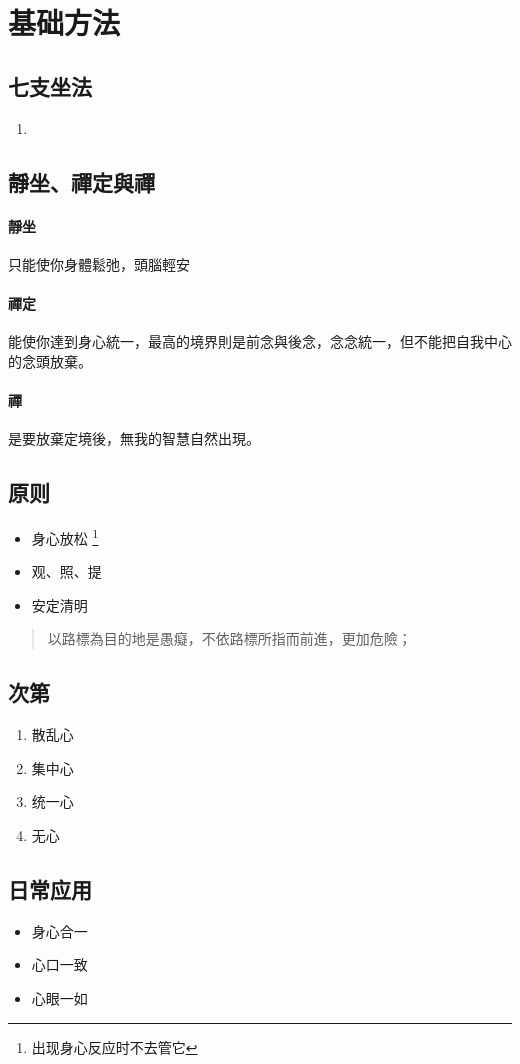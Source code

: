 \section{基础方法}

\subsection{七支坐法}
\begin{enumerate}
  \item
\end{enumerate}

\subsection{靜坐、禪定與禪}
\paragraph{靜坐} 只能使你身體鬆弛，頭腦輕安
\paragraph{禪定} 能使你達到身心統一，最高的境界則是前念與後念，念念統一，但不能把自我中心的念頭放棄。
\paragraph{禪} 是要放棄定境後，無我的智慧自然出現。

\subsection{原则}
\begin{itemize}
  \item 身心放松
    \footnote{出现身心反应时不去管它}
  \item 观、照、提
  \item 安定清明
\end{itemize}
\begin{quote}
  以路標為目的地是愚癡，不依路標所指而前進，更加危險；
\end{quote}


\subsection{次第}
\begin{enumerate}
  \item 散乱心
  \item 集中心
  \item 统一心
  \item 无心
\end{enumerate}

\subsection{日常应用}
\begin{itemize}
  \item 身心合一
  \item 心口一致
  \item 心眼一如
\end{itemize}
